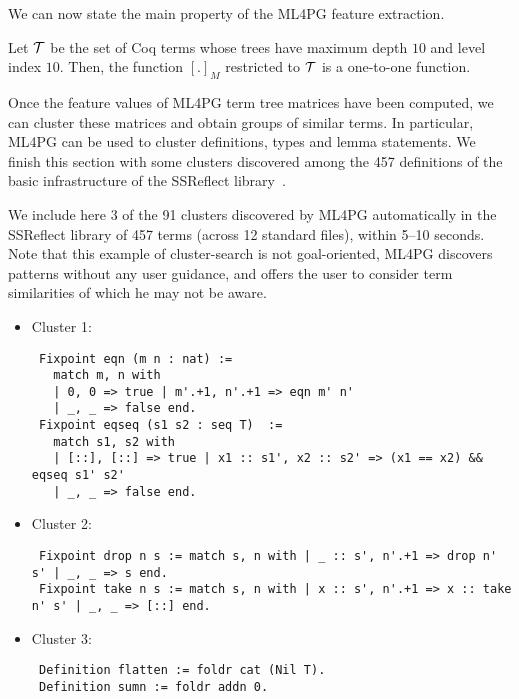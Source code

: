 We can now state the main property of the ML4PG feature extraction.

\begin{proposition}
Let ${\cal T}$ be the set of Coq terms  whose trees have maximum depth $10$ and level index $10$.
Then, the function $[.]_{M}$ restricted to ${\cal T}$ is a one-to-one function.
\end{proposition}

Once the feature values of ML4PG term tree matrices have been computed, we can cluster these matrices and
obtain groups of similar terms. In particular, ML4PG can be used to cluster definitions, types and lemma
statements.
We finish this section with some clusters discovered among the 457 definitions of the basic infrastructure of the SSReflect
library~\cite{SSReflect}.

\begin{example}
We include here 3 of the 91 clusters discovered by ML4PG automatically in the SSReflect library of 457 terms (across 12 standard files), within 5--10 seconds.
Note that this example of cluster-search is not goal-oriented, ML4PG discovers patterns without any user guidance, and offers the user to consider term similarities of which he may
not be aware.

\begin{itemize}
 \item Cluster 1:
{\scriptsize \begin{lstlisting}
 Fixpoint eqn (m n : nat) :=
   match m, n with
   | 0, 0 => true | m'.+1, n'.+1 => eqn m' n'
   | _, _ => false end.
 Fixpoint eqseq (s1 s2 : seq T)  :=
   match s1, s2 with
   | [::], [::] => true | x1 :: s1', x2 :: s2' => (x1 == x2) && eqseq s1' s2'
   | _, _ => false end.
\end{lstlisting}}

\item  Cluster 2:
{\scriptsize
\begin{lstlisting}
 Fixpoint drop n s := match s, n with | _ :: s', n'.+1 => drop n' s' | _, _ => s end.
 Fixpoint take n s := match s, n with | x :: s', n'.+1 => x :: take n' s' | _, _ => [::] end.
\end{lstlisting}}

\item Cluster 3:
{\scriptsize
\begin{lstlisting}
 Definition flatten := foldr cat (Nil T).
 Definition sumn := foldr addn 0.
\end{lstlisting}}
\end{itemize}



\end{example}

